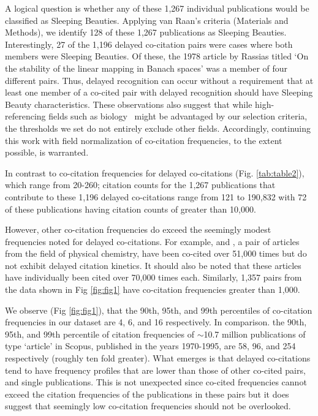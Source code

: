 \documentclass[utf8]{frontiersSCNS}
\begin{document}
A logical question is whether any of these 1,267 individual publications would be classified as Sleeping Beauties. Applying van Raan's criteria (Materials and Methods), we identify 128 of these 1,267 publications as Sleeping Beauties. Interestingly, 27 of the 1,196 delayed co-citation pairs were cases where both members were Sleeping Beauties. Of these, the 1978 article by Rassias titled `On the stability of the linear mapping in Banach spaces' was a member of four different pairs. Thus, delayed recognition can occur without a requirement that at least one member of a co-cited pair with delayed recognition should have Sleeping Beauty characteristics. These  observations also suggest that while high-referencing fields such as biology~\citep{Small1980} might be advantaged by our selection criteria, the thresholds we set do not entirely exclude other fields. Accordingly, continuing this work with field normalization of co-citation frequencies, to the extent possible, is warranted.

In contrast to co-citation frequencies for delayed co-citations (Fig. \ref{tab:table2}), which range from 20-260; citation counts for the 1,267 publications that contribute to these 1,196 delayed co-citations range from 121 to 190,832 with 72 of these publications having citation counts of greater than 10,000. 

However, other co-citation frequencies do exceed the seemingly modest frequencies noted for delayed co-citations. For example, \cite{becke_densityfunctional_1993} and \cite{lee_development_1988}, a pair of articles from the field of physical chemistry, have been co-cited over 51,000 times but do not exhibit delayed citation kinetics. It should also be noted that these articles have individually been cited over 70,000 times each. Similarly, 1,357 pairs from the data shown in Fig \ref{fig:fig1} have co-citation frequencies greater than 1,000. 

We observe (Fig \ref{fig:fig1}), that the 90th, 95th, and 99th percentiles of co-citation frequencies in our dataset are 4, 6, and 16 respectively. In comparison. the 90th, 95th, and 99th percentile of citation frequencies of $\sim$10.7 million publications of type `article' in Scopus, published in the years 1970-1995, are 58, 96, and 254 respectively (roughly ten fold greater). What emerges is that delayed co-citations tend to have frequency profiles that are lower than those of other co-cited pairs, and single publications. This is not unexpected since co-cited frequencies cannot exceed the citation frequencies of the publications in these pairs but it does suggest that seemingly low co-citation frequencies should not be overlooked. 
\end{document}
